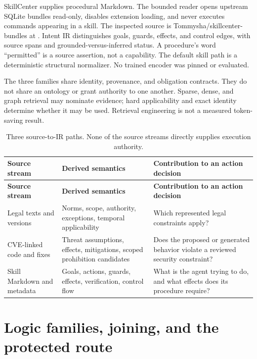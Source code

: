 \documentclass{article}
\begin{document}
SkillCenter supplies procedural Markdown. The bounded reader opens upstream SQLite bundles read-only, disables extension loading, and never executes commands appearing in a skill. The inspected source is Tommysha/skillcenter-bundles at . Intent IR distinguishes goals, guards, effects, and control edges, with source spans and grounded-versus-inferred status. A procedure's word ``permitted'' is a source assertion, not a capability. The default skill path is a deterministic structural normalizer. No trained encoder was pinned or evaluated.

The three families share identity, provenance, and obligation contracts. They do not share an ontology or grant authority to one another. Sparse, dense, and graph retrieval may nominate evidence; hard applicability and exact identity determine whether it may be used. Retrieval engineering is not a measured token-saving result.
\begingroup
\renewcommand{\thetable}{1}
\begin{longtable}{@{}>{\raggedright\arraybackslash}p{.24\linewidth} >{\raggedright\arraybackslash}p{.32\linewidth} >{\raggedright\arraybackslash}p{.38\linewidth}@{}}
\caption{Three source-to-IR paths. None of the source streams directly supplies execution authority.}\label{tab:1}\\
\toprule
\textbf{Source stream} & \textbf{Derived semantics} & \textbf{Contribution to an action decision} \\
\midrule
\endfirsthead
\textbf{Source stream} & \textbf{Derived semantics} & \textbf{Contribution to an action decision} \\
\midrule
\endhead
\bottomrule
\endlastfoot
Legal texts and versions & Norms, scope, authority, exceptions, temporal applicability & Which represented legal constraints apply? \\[3pt]
CVE-linked code and fixes & Threat assumptions, effects, mitigations, scoped prohibition candidates & Does the proposed or generated behavior violate a reviewed security constraint? \\[3pt]
Skill Markdown and metadata & Goals, actions, guards, effects, verification, control flow & What is the agent trying to do, and what effects does its procedure require? \\[3pt]
\end{longtable}
\endgroup

\section{Logic families, joining, and the protected route}
\end{document}
